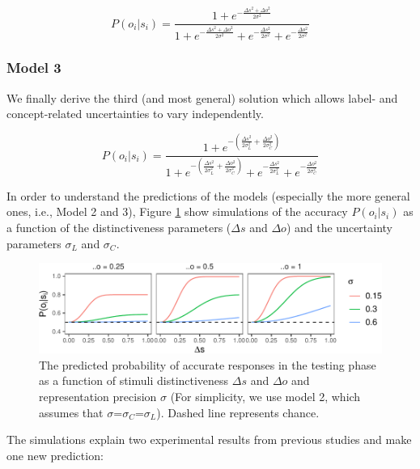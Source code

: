 \documentclass[english,,man]{apa6}
\begin{document}
\begin{equation} \label{eq:model2}
P(o_i|s_i)= \frac{1 + e^{- \frac{\Delta s^2 + \Delta o^2}{2\sigma^2}}}{1 + e^{-\frac{\Delta s^2 + \Delta o^2}{2\sigma^2}}+ e^{-\frac{\Delta s^2}{2\sigma^2}} + e^{-\frac{\Delta o^2}{2\sigma^2}}}
\end{equation}

\hypertarget{model-3}{%
\subsubsection{Model 3}\label{model-3}}

We finally derive the third (and most general) solution which allows label- and concept-related uncertainties to vary independently.

\begin{equation} \label{eq:model3}
P(o_i|s_i)= \frac{1 + e^{- (\frac{\Delta s^2}{2\sigma_L^2}+ \frac{\Delta o^2}{2\sigma_C^2})}}{1 + e^{-(\frac{\Delta s^2}{2\sigma_L^2}+ \frac{\Delta o^2}{2\sigma_C^2})}+ e^{-\frac{\Delta s^2}{2\sigma_L^2}} + e^{-\frac{\Delta o^2}{2\sigma_C^2}}}
\end{equation}

In order to understand the predictions of the models (especially the more general ones, i.e., Model 2 and 3), Figure \ref{fig:simulation} show simulations of the accuracy \(P(o_i|s_i)\) as a function of the distinctiveness parameters (\(\Delta s\) and \(\Delta o\)) and the uncertainty parameters \(\sigma_L\) and \(\sigma_C\).

\begin{figure}
\centering
\includegraphics{ms_blind_files/figure-latex/simulation-1.pdf}
\caption{\label{fig:simulation}The predicted probability of accurate responses in the testing phase as a function of stimuli distinctiveness \(\Delta s\) and \(\Delta o\) and representation precision \(\sigma\) (For simplicity, we use model 2, which assumes that \(\sigma\)=\(\sigma_C\)=\(\sigma_L\)). Dashed line represents chance.}
\end{figure}

The simulations explain two experimental results from previous studies and make one new prediction:
\end{document}
